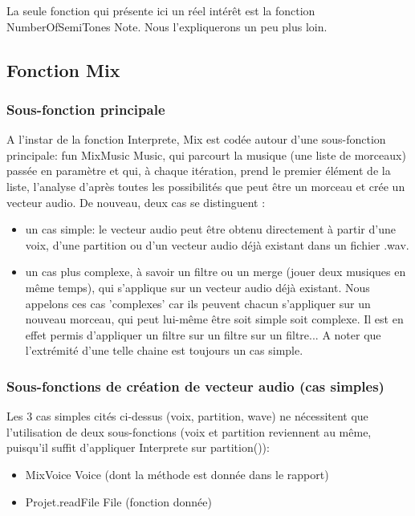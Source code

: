 \documentclass[12pt,a4paper]{article}
\begin{document}
La seule fonction qui présente ici un réel intérêt est la fonction {NumberOfSemiTones Note}. Nous l'expliquerons un peu plus loin.

\subsection{Fonction Mix}


\subsubsection{Sous-fonction principale}


A l'instar de la fonction Interprete, Mix est codée autour d'une sous-fonction principale: fun {MixMusic Music}, qui parcourt la musique (une liste de morceaux) passée en paramètre et qui, à chaque itération, prend le premier élément de la liste, l'analyse d'après toutes les possibilités que peut être un morceau et crée un vecteur audio. 
De nouveau, deux cas se distinguent :
\begin{itemize}
\item un cas simple: le vecteur audio peut être obtenu directement à partir d'une voix, d'une partition ou d'un vecteur audio déjà existant dans un fichier .wav.
\item un cas plus complexe, à savoir un filtre ou un merge (jouer deux musiques en même temps), qui s'applique sur un vecteur audio déjà existant. Nous appelons ces cas 'complexes' car ils peuvent chacun s'appliquer sur un nouveau morceau, qui peut lui-même être soit simple soit complexe. Il est en effet permis d'appliquer un filtre sur un filtre sur un filtre... A noter que l'extrémité d'une telle chaine est toujours un cas simple.
\end{itemize}

\subsubsection{Sous-fonctions de création de vecteur audio (cas simples)}

Les 3 cas simples cités ci-dessus (voix, partition, wave)  ne nécessitent que l'utilisation de deux sous-fonctions (voix et partition reviennent au même, puisqu'il suffit d'appliquer Interprete sur partition()):
\begin{itemize}
\item {MixVoice Voice} (dont la méthode est donnée dans le rapport)
\item {Projet.readFile File} (fonction donnée)
\end{itemize}
\end{document}
